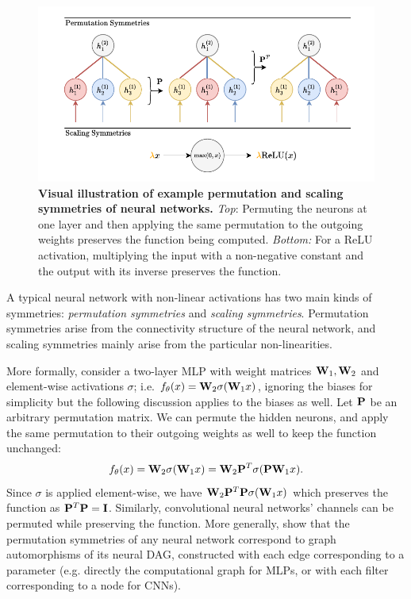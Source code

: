 \begin{figure}[t!]
    \centering
    \includegraphics[width=\textwidth]{figures/nn_permutations.drawio.pdf}
    \caption{\label{fig:nn_sym}\textbf{Visual illustration of example permutation and scaling symmetries of neural networks.} \textit{Top}: Permuting the neurons at one layer and then applying the same permutation to the outgoing weights preserves the function being computed. \textit{Bottom:} For a ReLU activation, multiplying the input with a non-negative constant and the output with its inverse preserves the function. }    
\end{figure}

A typical neural network with non-linear activations has two main kinds of symmetries: \textit{permutation symmetries} and \textit{scaling symmetries}. Permutation symmetries arise from the connectivity structure of the neural network, and scaling symmetries mainly arise from the particular non-linearities. 

More formally, consider a two-layer MLP with weight matrices $\mathbf{W}_1, \mathbf{W}_2$ and element-wise activations $\sigma$; i.e. $f_\theta(x) = \mathbf{W}_2 \sigma (\mathbf{W}_1x)$, ignoring the biases for simplicity but the following discussion applies to the biases as well. Let $\mathbf{P}$ be an arbitrary permutation matrix. We can permute the hidden neurons, and apply the same permutation to their outgoing weights as well to keep the function unchanged:
\begin{equation}
    f_\theta(x) = \mathbf{W}_2 \sigma (\mathbf{W}_1x) = \mathbf{W}_2 \mathbf{P}^T \sigma (\mathbf{P} \mathbf{W}_1x).
\end{equation}
Since $\sigma$ is applied element-wise, we have $\mathbf{W}_2 \mathbf{P}^T  \mathbf{P} \sigma (\mathbf{W}_1x)$ which preserves the function as $\mathbf{P}^T  \mathbf{P} = \mathbf{I}$. Similarly, convolutional neural networks' channels can be permuted while preserving the function. More generally, \citet{limGraphMetanetworksProcessing2023} show that the permutation symmetries of any neural network correspond to graph automorphisms of its neural DAG, constructed with each edge corresponding to a parameter (e.g. directly the computational graph for MLPs, or with each filter corresponding to a node for CNNs).

